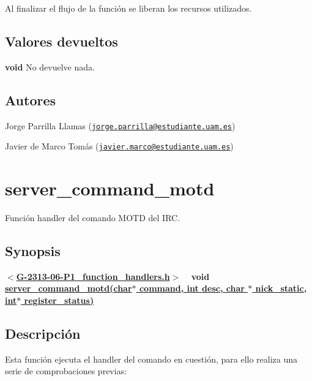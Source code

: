 Al finalizar el flujo de la función se liberan los recursos utilizados.\hypertarget{server_command_topic_return_topic}{}\subsection{Valores devueltos}\label{server_command_topic_return_topic}

\begin{DoxyItemize}
\item {\bfseries void} No devuelve nada. 
\end{DoxyItemize}\hypertarget{server_command_topic_authors_topic}{}\subsection{Autores}\label{server_command_topic_authors_topic}

\begin{DoxyItemize}
\item Jorge Parrilla Llamas (\href{mailto:jorge.parrilla@estudiante.uam.es}{\tt jorge.\+parrilla@estudiante.\+uam.\+es}) 
\item Javier de Marco Tomás (\href{mailto:javier.marco@estudiante.uam.es}{\tt javier.\+marco@estudiante.\+uam.\+es}) 
\end{DoxyItemize}\hypertarget{server_command_motd}{}\section{server\+\_\+command\+\_\+motd}\label{server_command_motd}
Función handler del comando M\+O\+TD del I\+RC.\hypertarget{server_command_motd_synopsis_motd}{}\subsection{Synopsis}\label{server_command_motd_synopsis_motd}
{ {\bfseries $<$\hyperlink{G-2313-06-P1__function__handlers_8h}{G-\/2313-\/06-\/\+P1\+\_\+function\+\_\+handlers.\+h}$>$} ~\newline
 {\bfseries void \hyperlink{G-2313-06-P1__function__handlers_8c_a1258d3bdf779b82c3f952bdde3d62631}{server\+\_\+command\+\_\+motd(char$\ast$ command, int desc, char $\ast$ nick\+\_\+static, int$\ast$ register\+\_\+status)}} } \hypertarget{server_command_motd_descripcion_motd}{}\subsection{Descripción}\label{server_command_motd_descripcion_motd}
Esta función ejecuta el handler del comando en cuestión, para ello realiza una serie de comprobaciones previas\+:


